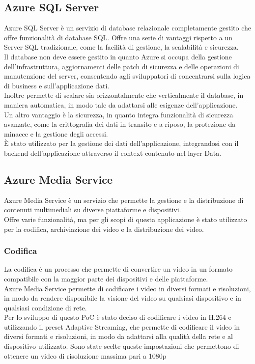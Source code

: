 \subsection{Azure SQL Server}
Azure SQL Server è un servizio di database relazionale completamente gestito che offre funzionalità di database SQL.
Offre una serie di vantaggi rispetto a un Server SQL tradizionale, come la facilità di gestione, la scalabilità e sicurezza.\\
Il database non deve essere gestito in quanto Azure si occupa della gestione dell'infrastruttura, aggiornamenti delle patch di sicurezza e delle operazioni di manutenzione del server, consentendo agli sviluppatori di concentrarsi sulla logica di business e sull'applicazione dati.\\
Inoltre permette di scalare sia orizzontalmente che verticalmente il database, in maniera automatica, in modo tale da adattarsi alle esigenze dell'applicazione.\\
Un altro vantaggio è la sicurezza, in quanto integra funzionalità di sicurezza avanzate, come la crittografia dei dati in transito e a riposo, la protezione da minacce e la gestione degli accessi.\\
È stato utilizzato per la gestione dei dati dell'applicazione, integrandosi con il backend dell'applicazione attraverso il context contenuto nel layer Data.\\

\subsection{Azure Media Service}
Azure Media Service è un servizio che permette la gestione e la distribuzione di contenuti multimediali su diverse piattaforme e dispositivi.\\
Offre varie funzionalità, ma per gli scopi di questa applicazione è stato utilizzato per la codifica, archiviazione dei video e la distribuzione dei video.\\

\subsubsection{Codifica}
La codifica è un processo che permette di convertire un video in un formato compatibile con la maggior parte dei dispositivi e delle piattaforme.\\
Azure Media Service permette di codificare i video in diversi formati e risoluzioni, in modo da rendere disponibile la visione del video su qualsiasi dispositivo e in qualsiasi condizione di rete.\\
Per lo sviluppo di questo PoC è stato deciso di codificare i video in H.264 e utilizzando il preset Adaptive Streaming, che permette di codificare il video in diversi formati e risoluzioni, in modo da adattarsi alla qualità della rete e al dispositivo utilizzato. Sono state scelte queste impostazioni che permettono di ottenere un video di risoluzione massima pari a 1080p 

